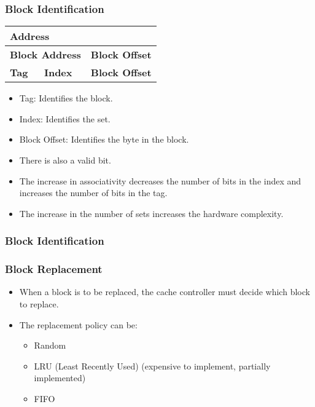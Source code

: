 \begin{frame}
    \frametitle{Block Identification}
    \begin{table}[h!]
        \centering
        \begin{tabular}{|p{5cm}|p{3cm}|p{3cm}|}
            \hline
            \multicolumn{3}{|p{11cm}|}{\textbf{Address}} \\
            \hline
            \multicolumn{2}{|p{8cm}|}{\textbf{Block Address}} & \multicolumn{1}{p{3cm}|}{\textbf{Block Offset}} \\
            \hline
            \multicolumn{1}{|p{5cm}|}{\textbf{Tag}} & \multicolumn{1}{|p{3cm}|}{\textbf{Index}} & \multicolumn{1}{p{3cm}|}{\textbf{Block Offset}} \\
            \hline
        \end{tabular}
    \end{table}
    \begin{itemize}
        \item Tag: Identifies the block.
        \item Index: Identifies the set.
        \item Block Offset: Identifies the byte in the block.
        \item There is also a valid bit.
        \item The increase in associativity decreases the number of bits in the index and increases the number of bits in the tag.
        \item The increase in the number of sets increases the hardware complexity.
    \end{itemize}
\end{frame}


\begin{frame}
    \frametitle{Block Identification}
\end{frame}

\begin{frame}
    \frametitle{Block Replacement}
    \begin{itemize}
        \item When a block is to be replaced, the cache controller must decide which block to replace.
        \item The replacement policy can be:
        \begin{itemize}
            \item Random
            \item LRU (Least Recently Used) (expensive to implement, partially implemented)
            \item FIFO
        \end{itemize}
    \end{itemize}
\end{frame}


